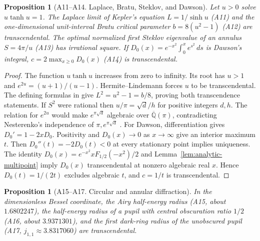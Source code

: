 \documentclass[11pt,a4paper]{article}
\newtheorem{proposition}[theorem]{Proposition}
\theoremstyle{definition}
\theoremstyle{remark}
\begin{document}
\par\hypertarget{cat-A11}{}\label{page:A11}\hypertarget{cat-A12}{}\label{page:A12}\hypertarget{cat-A13}{}\label{page:A13}\hypertarget{cat-A14}{}\label{page:A14}
\begin{proposition}[A11--A14. Laplace, Bratu, Steklov, and Dawson]
Let $u>0$ solve $u\tanh u=1$. The Laplace limit of Kepler's equation
$L=1/\sinh u$ (A11) and the one-dimensional unit-interval Bratu critical
parameter $b=8(u^2-1)$ (A12) are transcendental. The optimal normalized
first Steklov eigenvalue of an annulus $S=4\pi/u$ (A13) has irrational
square. If $D_0(x)=e^{-x^2}\int_0^xe^{s^2}\,ds$ is Dawson's integral,
$c=2\max_{x\ge0}D_0(x)$ (A14) is transcendental.
\end{proposition}
\begin{proof}
The function $u\tanh u$ increases from zero to infinity. Its root has
$u>1$ and $e^{2u}=(u+1)/(u-1)$. Hermite--Lindemann forces $u$ to be
transcendental. The defining formulas in \cite{aMcM,aBuck,aFraser}
give $L^2=u^2-1=b/8$, proving both transcendence statements. If
$S^2$ were rational then $u/\pi=\sqrt{d}/h$ for positive integers
$d,h$. The relation for $e^{2u}$ would make $e^{\pi\sqrt d}$ algebraic
over $\overline{\mathbb Q}(\pi)$, contradicting Nesterenko's
independence of $\pi,e^{\pi\sqrt d}$ \cite[Corollary 6]{aNest}.
For Dawson, differentiation gives $D_0'=1-2xD_0$. Positivity and
$D_0(x)\to0$ as $x\to\infty$ give an interior maximum $t$. Then
$D_0''(t)=-2D_0(t)<0$ at every stationary point implies uniqueness.
The identity $D_0(x)=e^{-x^2}xF_{1/2}(-x^2)/2$ and
Lemma~\ref{lem:analytic-multipoint} imply $D_0(x)$ transcendental
at nonzero algebraic real $x$. Hence $D_0(t)=1/(2t)$ excludes algebraic
$t$, and $c=1/t$ is transcendental.
\end{proof}
\par\hypertarget{cat-A15}{}\label{page:A15}\hypertarget{cat-A16}{}\label{page:A16}\hypertarget{cat-A17}{}\label{page:A17}
\begin{proposition}[A15--A17. Circular and annular diffraction]
In the dimensionless Bessel coordinate, the Airy half-energy radius
(A15, about $1.6802247$), the half-energy radius of a pupil with
central obscuration ratio $1/2$ (A16, about $3.9371301$), and the first
dark-ring radius of the unobscured pupil (A17, $j_{1,1}\approx3.8317060$)
are transcendental.
\end{proposition}
\end{document}
